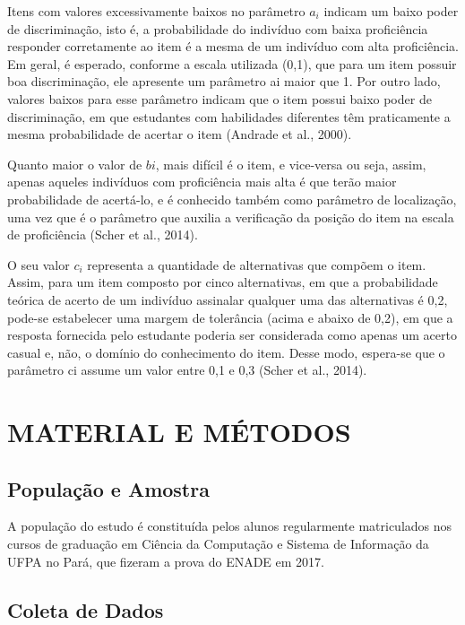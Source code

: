 \documentclass[12pt]{article}
\begin{document}
Itens com valores excessivamente baixos no parâmetro $a_{i}$ indicam um baixo poder de discriminação, isto é, a probabilidade do indivíduo com baixa proficiência responder corretamente ao item é a mesma de um indivíduo com alta proficiência. Em geral, é esperado, conforme a escala utilizada (0,1), que para um item possuir boa discriminação, ele apresente um parâmetro ai maior que 1. Por outro lado, valores baixos para esse parâmetro indicam que o item possui baixo poder de discriminação, em que estudantes com habilidades diferentes têm praticamente a mesma probabilidade de acertar o item (Andrade et al., 2000).


Quanto maior o valor de $b{i}$, mais difícil é o item, e vice-versa ou seja, assim, apenas aqueles indivíduos com proficiência mais alta é que terão maior probabilidade de acertá-lo, e é conhecido também como parâmetro de localização, uma vez que é o parâmetro que auxilia a verificação da posição do item na escala de proficiência (Scher et al., 2014).

O seu valor $c_{i}$  representa a quantidade de alternativas que compõem o item. Assim, para um item composto por cinco alternativas, em que a probabilidade teórica de acerto de um indivíduo assinalar qualquer uma das alternativas é 0,2, pode-se estabelecer uma margem de tolerância (acima e abaixo de 0,2), em que a resposta fornecida pelo estudante poderia ser considerada como apenas um acerto casual e, não, o domínio do conhecimento do item. Desse modo, espera-se que o parâmetro ci assume um valor entre 0,1 e 0,3 (Scher et al., 2014).




\section{MATERIAL E MÉTODOS}

\subsection{População e Amostra}
\label{sec:metmodal}

A população do estudo é constituída pelos alunos regularmente matriculados nos cursos de graduação em Ciência da Computação e Sistema de Informação da UFPA no Pará, que fizeram a prova do ENADE em 2017.\vskip0.3cm


\subsection{Coleta de Dados}
\end{document}
